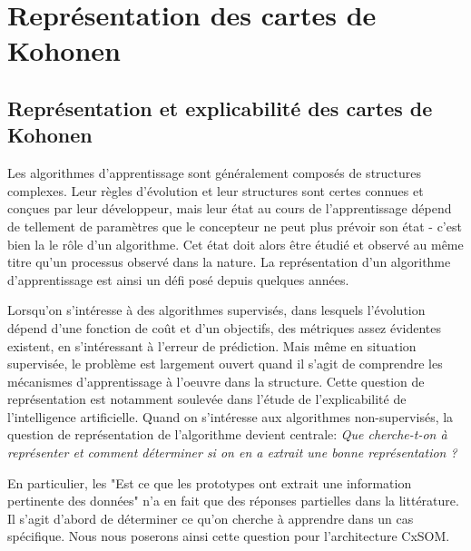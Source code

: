 \chapter{Représentation des cartes de Kohonen}
\graphicspath{{03-Representation/}}

\minitoc
\section{Représentation et explicabilité des cartes de Kohonen}

Les algorithmes d'apprentissage sont généralement composés de structures complexes. Leur règles d'évolution et leur structures sont certes connues et conçues par leur développeur, mais leur état au cours de l'apprentissage dépend de tellement de paramètres que le concepteur ne peut plus prévoir son état - c'est bien la le rôle d'un algorithme. Cet état doit alors être étudié et observé au même titre qu'un processus observé dans la nature. La représentation d'un algorithme d'apprentissage est ainsi un défi posé depuis quelques années. 

Lorsqu'on s'intéresse à des algorithmes supervisés, dans lesquels l'évolution dépend d'une fonction de coût et d'un objectifs, des métriques assez évidentes existent, en s'intéressant à l'erreur de prédiction. Mais même en situation supervisée, le problème est largement ouvert quand il s'agit de comprendre les mécanismes d'apprentissage à l'oeuvre dans la structure. Cette question de représentation est notamment soulevée dans l'étude de l'explicabilité de l'intelligence artificielle. Quand on s'intéresse aux algorithmes non-supervisés, la question de représentation de l'algorithme devient centrale: \emph{Que cherche-t-on à représenter et comment déterminer si on en a extrait une bonne représentation ?}

En particulier, les  "Est ce que les prototypes ont extrait une information pertinente des données" n'a en fait que des réponses partielles dans la littérature. Il s'agit d'abord de déterminer ce qu'on cherche à apprendre dans un cas spécifique. Nous nous poserons ainsi cette question pour l'architecture CxSOM. 
%



